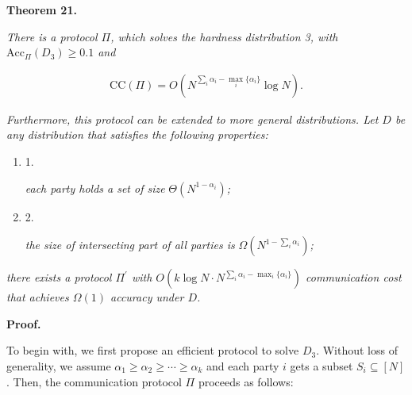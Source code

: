 \documentclass[10pt,a4paper]{article}
\begin{document}


\par\medskip\noindent\textbf{
\textbf{Theorem 21}\textbf{.}
}\par



\emph{There is a protocol $\Pi$, which solves the hardness distribution 3, with $\text{Acc}_{\Pi}(D_{3})\geq 0.1$ and}\par


\[\begin{gathered}
\text{CC}(\Pi)=O(N^{\sum_{i}\alpha_{i}-\mathop{\max}_{i}\{\alpha_{i}\}}\log N).
\end{gathered}\]




\emph{Furthermore, this protocol can be extended to more general distributions. Let $D$ be any distribution that satisfies the following properties:}\par


\begin{enumerate}


\item[] 
1. 


\emph{each party holds a set of size }$\Theta(N^{1-\alpha_{i}})$\emph{;}\par





\item[] 
2. 


\emph{the size of intersecting part of all parties is }$\Omega(N^{1-\sum_{i}\alpha_{i}})$\emph{;}\par





\end{enumerate}


\emph{there exists a protocol $\Pi^{\prime}$ with $O(k\log N\cdot N^{\sum_{i}\alpha_{i}-\mathop{\max}_{i}\{\alpha_{i}\}})$ communication cost that achieves $\Omega(1)$ accuracy under $D$.}\par






\par\medskip\noindent\textbf{Proof.}\par




To begin with, we first propose an efficient protocol to solve $D_{3}$.
Without loss of generality, we assume $\alpha_{1}\geq\alpha_{2}\geq\cdots\geq\alpha_{k}$ and each party $i$ gets a subset $S_{i}\subseteq[N]$. Then, the communication protocol $\Pi$ proceeds as follows:\par
\end{document}
